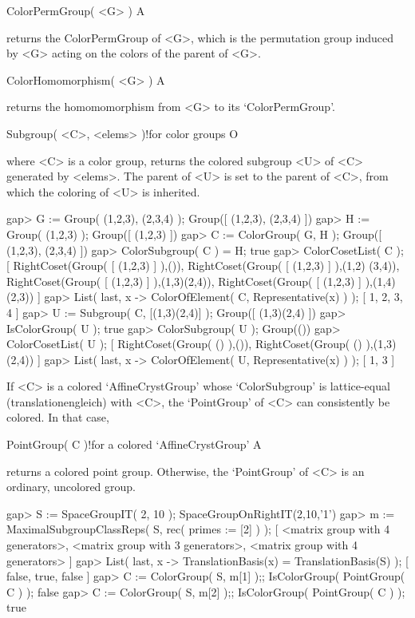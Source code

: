 \>ColorPermGroup( <G> ) A

returns the ColorPermGroup of <G>, which is the permutation group 
induced by <G> acting on the colors of the parent of <G>.

\>ColorHomomorphism( <G> ) A

returns the homomomorphism from <G> to its `ColorPermGroup'.

\>Subgroup( <C>, <elems> )!{for color groups} O

where <C> is a color group, returns the colored subgroup <U> of <C>
generated by <elems>. The parent of <U> is set to the parent of <C>, 
from which the coloring of <U> is inherited.

\beginexample
gap> G := Group(  (1,2,3), (2,3,4) );
Group([ (1,2,3), (2,3,4) ])
gap> H := Group( (1,2,3) ); 
Group([ (1,2,3) ])
gap> C := ColorGroup( G, H );
Group([ (1,2,3), (2,3,4) ])
gap> ColorSubgroup( C ) = H;
true
gap> ColorCosetList( C );
[ RightCoset(Group( [ (1,2,3) ] ),()), RightCoset(Group( [ (1,2,3) ] ),(1,2)
    (3,4)), RightCoset(Group( [ (1,2,3) ] ),(1,3)(2,4)), 
  RightCoset(Group( [ (1,2,3) ] ),(1,4)(2,3)) ]
gap> List( last, x -> ColorOfElement( C, Representative(x) ) );
[ 1, 2, 3, 4 ]
gap> U := Subgroup( C, [(1,3)(2,4)] );
Group([ (1,3)(2,4) ])
gap> IsColorGroup( U );
true
gap> ColorSubgroup( U );
Group(())
gap> ColorCosetList( U );
[ RightCoset(Group( () ),()), RightCoset(Group( () ),(1,3)(2,4)) ]
gap> List( last, x -> ColorOfElement( U, Representative(x) ) );
[ 1, 3 ]
\endexample


If <C> is a colored `AffineCrystGroup' whose `ColorSubgroup' is 
lattice-equal (translationengleich) with <C>, the `PointGroup' of 
<C> can consistently be colored. In that case,

\>PointGroup( C )!{for a colored `AffineCrystGroup'} A

returns a colored point group. Otherwise, the `PointGroup' of <C> is
an ordinary, uncolored group.

\beginexample
gap> S := SpaceGroupIT( 2, 10 );                                  
SpaceGroupOnRightIT(2,10,'1')
gap> m := MaximalSubgroupClassReps( S, rec( primes := [2] ) );    
[ <matrix group with 4 generators>, <matrix group with 3 generators>, 
  <matrix group with 4 generators> ]
gap> List( last, x -> TranslationBasis(x) = TranslationBasis(S) );
[ false, true, false ]
gap> C := ColorGroup( S, m[1] );; IsColorGroup( PointGroup( C ) );
false
gap> C := ColorGroup( S, m[2] );; IsColorGroup( PointGroup( C ) );
true
\endexample

